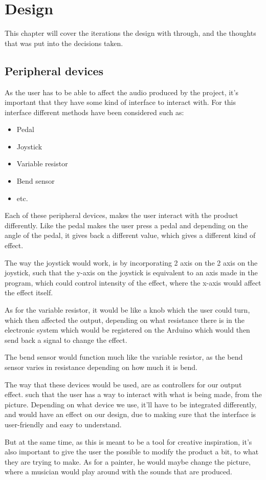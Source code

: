 \chapter{Design}\label{ch:design}
This chapter will cover the iterations the design with through, and the thoughts that was put into the decisions taken.


\section{Peripheral devices}
As the user has to be able to affect the audio produced by the project, it's important that they have some kind of interface to interact with. For this interface different methods have been considered such as:

\begin{itemize}
\item Pedal
\item Joystick
\item Variable resistor
\item Bend sensor
\item etc.
\end{itemize}

Each of these peripheral devices, makes the user interact with the product differently. Like the pedal makes the user press a pedal and depending on the angle of the pedal, it gives back a different value, which gives a different kind of effect.

The way the joystick would work, is by incorporating 2 axis on the 2 axis on the joystick, such that the y-axis on the joystick is equivalent to an axis made in the program, which could control intensity of the effect, where the x-axis would affect the effect itself. 

As for the variable resistor, it would be like a knob which the user could turn, which then affected the output, depending on what resistance there is in the electronic system which would be registered on the Arduino which would then send back a signal to change the effect. 

The bend sensor would function much like the variable resistor, as the bend sensor varies in resistance depending on how much it is bend.

The way that these devices would be used, are as controllers for our output effect. such that the user has a way to interact with what is being made, from the picture. Depending on what device we use, it'll have to be integrated differently, and would have an effect on our design, due to making sure that the interface is user-friendly and easy to understand. 

But at the same time, as this is meant to be a tool for creative inspiration, it's also important to give the user the possible to modify the product a bit, to what they are trying to make. As for a painter, he would maybe change the picture, where a musician would play around with the sounds that are produced. 